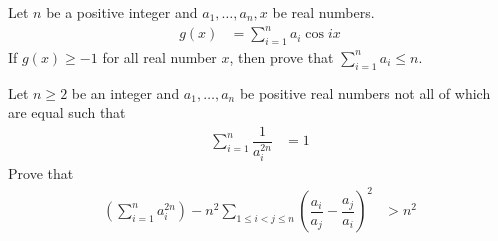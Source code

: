 \documentclass{subfile}
\begin{document}
		\begin{problem}
			Let $n$ be a positive integer and $a_{1},\ldots,a_{n},x$ be real numbers.
				\begin{align*}
					g(x)
						& = \sum_{i=1}^{n}a_{i}\cos{ix}
				\end{align*}
			If $g(x)\geq -1$ for all real number $x$, then prove that $\sum_{i=1}^{n}a_{i}\leq n$.
		\end{problem}
	
		\begin{problem}
			Let $n\geq 2$ be an integer and $a_{1},\ldots,a_{n}$ be positive real numbers not all of which are equal such that
				\begin{align*}
					\sum_{i=1}^{n}\dfrac{1}{a_{i}^{2n}}
						& = 1
				\end{align*}
			Prove that
				\begin{align*}
					\left(\sum_{i=1}^{n}a_{i}^{2n}\right)-n^{2}\sum_{1\leq i < j\leq n}\left(\dfrac{a_{i}}{a_{j}}-\dfrac{a_{j}}{a_{i}}\right)^{2}
						& > n^{2}
				\end{align*}
		\end{problem}
\end{document}
